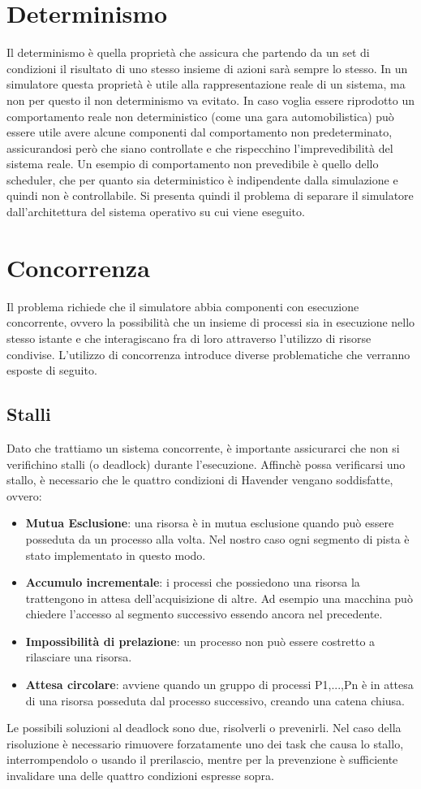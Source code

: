 \section{Determinismo}
Il determinismo è quella proprietà che assicura che partendo da un set di condizioni il risultato di uno stesso insieme di azioni sarà sempre lo stesso. In un simulatore questa proprietà è utile alla rappresentazione reale di un sistema, ma non per questo il non determinismo va evitato. In caso voglia essere riprodotto un comportamento reale non deterministico (come una gara automobilistica) può essere utile avere alcune componenti dal comportamento non predeterminato, assicurandosi però che siano controllate e che rispecchino l'imprevedibilità del sistema reale. Un esempio di comportamento non prevedibile è quello dello scheduler, che per quanto sia deterministico è indipendente dalla simulazione e quindi non è controllabile. Si presenta quindi il problema di separare il simulatore dall'architettura del sistema operativo su cui viene eseguito.

\section{Concorrenza}
Il problema richiede che il simulatore abbia componenti con esecuzione concorrente, ovvero la possibilità che un insieme di processi sia in esecuzione nello stesso istante e che interagiscano fra di loro attraverso l'utilizzo di risorse condivise.
L'utilizzo di concorrenza introduce diverse problematiche che verranno esposte di seguito.

 \subsection{Stalli}
 Dato che trattiamo un sistema concorrente, è importante assicurarci che non si verifichino stalli (o deadlock) durante l’esecuzione.
Affinchè possa verificarsi uno stallo, è necessario che le quattro condizioni di Havender vengano soddisfatte, ovvero:
\begin{itemize}
 \item \textbf{Mutua Esclusione}: una risorsa è in mutua esclusione quando può essere posseduta da un processo alla volta. Nel nostro caso ogni segmento di pista è stato implementato in questo modo.
 \item \textbf{Accumulo incrementale}: i processi che possiedono una risorsa la trattengono in attesa dell’acquisizione di altre. Ad esempio una macchina può chiedere l’accesso al segmento successivo essendo ancora nel precedente.
 \item \textbf{Impossibilità di prelazione}: un processo non può essere costretto a rilasciare una risorsa.
 \item \textbf{Attesa circolare}: avviene quando un gruppo di processi P1,...,Pn è in attesa di una risorsa posseduta dal processo successivo, creando una catena chiusa.
\end{itemize}
Le possibili soluzioni al deadlock sono due, risolverli o prevenirli.
Nel caso della risoluzione è necessario rimuovere forzatamente uno dei task che causa lo stallo, interrompendolo o usando il prerilascio, mentre per la prevenzione è sufficiente invalidare una delle quattro condizioni espresse sopra.

